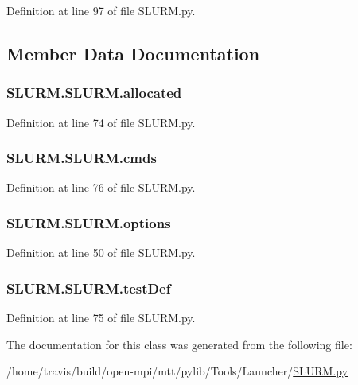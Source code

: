 Definition at line 97 of file S\-L\-U\-R\-M.\-py.



\subsection{Member Data Documentation}
\hypertarget{class_s_l_u_r_m_1_1_s_l_u_r_m_aee4130d6ff2007d08fad045aedd69781}{
\subsubsection[{allocated}]{\setlength{\rightskip}{0pt plus 5cm}S\-L\-U\-R\-M.\-S\-L\-U\-R\-M.\-allocated}}\label{class_s_l_u_r_m_1_1_s_l_u_r_m_aee4130d6ff2007d08fad045aedd69781}


Definition at line 74 of file S\-L\-U\-R\-M.\-py.

\hypertarget{class_s_l_u_r_m_1_1_s_l_u_r_m_ab755a940fd09c8fa416c177f692d31d6}{
\subsubsection[{cmds}]{\setlength{\rightskip}{0pt plus 5cm}S\-L\-U\-R\-M.\-S\-L\-U\-R\-M.\-cmds}}\label{class_s_l_u_r_m_1_1_s_l_u_r_m_ab755a940fd09c8fa416c177f692d31d6}


Definition at line 76 of file S\-L\-U\-R\-M.\-py.

\hypertarget{class_s_l_u_r_m_1_1_s_l_u_r_m_a652a43986b8bda5c6ddb866ab0513ac8}{
\subsubsection[{options}]{\setlength{\rightskip}{0pt plus 5cm}S\-L\-U\-R\-M.\-S\-L\-U\-R\-M.\-options}}\label{class_s_l_u_r_m_1_1_s_l_u_r_m_a652a43986b8bda5c6ddb866ab0513ac8}


Definition at line 50 of file S\-L\-U\-R\-M.\-py.

\hypertarget{class_s_l_u_r_m_1_1_s_l_u_r_m_a9b08ef79e039a8524f1fa6712b45182b}{
\subsubsection[{test\-Def}]{\setlength{\rightskip}{0pt plus 5cm}S\-L\-U\-R\-M.\-S\-L\-U\-R\-M.\-test\-Def}}\label{class_s_l_u_r_m_1_1_s_l_u_r_m_a9b08ef79e039a8524f1fa6712b45182b}


Definition at line 75 of file S\-L\-U\-R\-M.\-py.



The documentation for this class was generated from the following file\-:\begin{DoxyCompactItemize}
\item 
/home/travis/build/open-\/mpi/mtt/pylib/\-Tools/\-Launcher/\hyperlink{_s_l_u_r_m_8py}{S\-L\-U\-R\-M.\-py}\end{DoxyCompactItemize}
